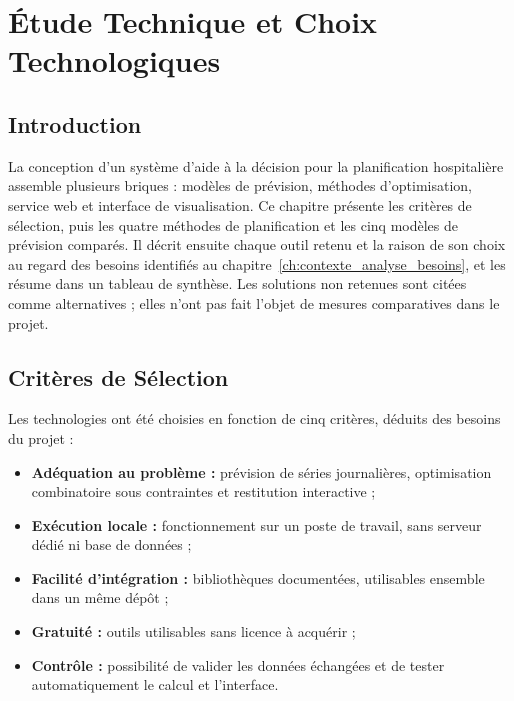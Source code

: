 \chapter{Étude Technique et Choix Technologiques}
\label{ch:etude_technique}

\section*{Introduction}
La conception d'un système d'aide à la décision pour la planification hospitalière assemble plusieurs briques : modèles de prévision, méthodes d'optimisation, service web et interface de visualisation. Ce chapitre présente les critères de sélection, puis les quatre méthodes de planification et les cinq modèles de prévision comparés. Il décrit ensuite chaque outil retenu et la raison de son choix au regard des besoins identifiés au chapitre~\ref{ch:contexte_analyse_besoins}, et les résume dans un tableau de synthèse. Les solutions non retenues sont citées comme alternatives ; elles n'ont pas fait l'objet de mesures comparatives dans le projet.

\section{Critères de Sélection}

Les technologies ont été choisies en fonction de cinq critères, déduits des besoins du projet :
\begin{itemize}
    \item \textbf{Adéquation au problème :} prévision de séries journalières, optimisation combinatoire sous contraintes et restitution interactive ;
    \item \textbf{Exécution locale :} fonctionnement sur un poste de travail, sans serveur dédié ni base de données ;
    \item \textbf{Facilité d'intégration :} bibliothèques documentées, utilisables ensemble dans un même dépôt ;
    \item \textbf{Gratuité :} outils utilisables sans licence à acquérir ;
    \item \textbf{Contrôle :} possibilité de valider les données échangées et de tester automatiquement le calcul et l'interface.
\end{itemize}

